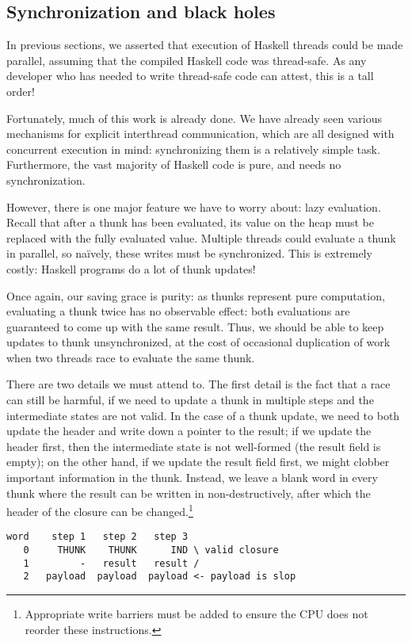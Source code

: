 \subsection{Synchronization and black holes} \label{sec:sync}

In previous sections, we asserted that execution of Haskell threads
could be made parallel, assuming that the compiled Haskell code was
thread-safe.  As any developer who has needed to write thread-safe code
can attest, this is a tall order!

Fortunately, much of this work is already done.  We have already seen various mechanisms
for explicit interthread communication, which are all designed with
concurrent execution in mind:  synchronizing them is a relatively simple
task.  Furthermore, the vast majority of Haskell code is pure, and needs no
synchronization.

However, there is one major feature we have to worry about: lazy
evaluation.  Recall that after a thunk has been evaluated, its value on
the heap must be replaced with the fully evaluated value. Multiple
threads could evaluate a thunk in parallel, so na\"ively, these writes
must be synchronized.  This is extremely costly: Haskell programs do a
lot of thunk updates!

Once again, our saving grace is purity: as thunks represent pure
computation, evaluating a thunk twice has no observable effect: both
evaluations are guaranteed to come up with the same result.  Thus, we
should be able to keep updates to thunk unsynchronized, at the cost of
occasional duplication of work when two threads race to evaluate the
same thunk.

There are two details we must attend to.  The first detail is the fact
that a race can still be harmful, if we need to update a thunk in
multiple steps and the intermediate states are not valid.  In the case
of a thunk update, we need to both update the header and write down a
pointer to the result; if we update the header first, then the
intermediate state is not well-formed (the result field is empty); on
the other hand, if we update the result field first, we might clobber
important information in the thunk.  Instead, we leave a blank word in
every thunk where the result can be written in non-destructively, after
which the header of the closure can be changed.\footnote{Appropriate
write barriers must be added to ensure the CPU does not reorder these
instructions.}

\begin{verbatim}
word    step 1   step 2   step 3
   0     THUNK    THUNK      IND \ valid closure
   1         -   result   result /
   2   payload  payload  payload <- payload is slop
\end{verbatim}

